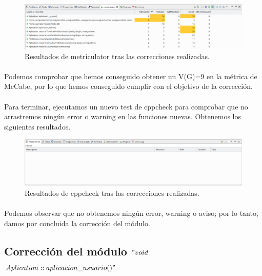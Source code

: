 			\begin{figure}[H]
				\centering
				\includegraphics[scale=0.32]{img/captura110.png}
				\caption{Resultados de metriculator tras las correcciones realizadas.}
				\label{captura110}
			\end{figure}
		
			\paragraph{}Podemos comprobar que hemos conseguido obtener un V(G)=9 en la métrica de McCabe, por lo que hemos conseguido cumplir con el objetivo de la corrección.
			
			\paragraph{}Para terminar, ejecutamos un nuevo test de cppcheck para comprobar que no arrastremos ningún error o warning en las funciones nuevas. Obtenemos los siguientes resultados.
			
			\begin{figure}[H]
				\centering
				\includegraphics[scale=0.32]{img/captura96.png}
				\caption{Resultados de cppcheck tras las correcciones realizadas.}
				\label{captura111}
			\end{figure}
		
			\paragraph{}Podemos observar que no obtenemos ningún error, warning o aviso; por lo tanto, damos por concluida la corrección del módulo.
			
	\subsection{Corrección del módulo $"void$ $Aplication::aplicacion\_usuario()"$}
	
